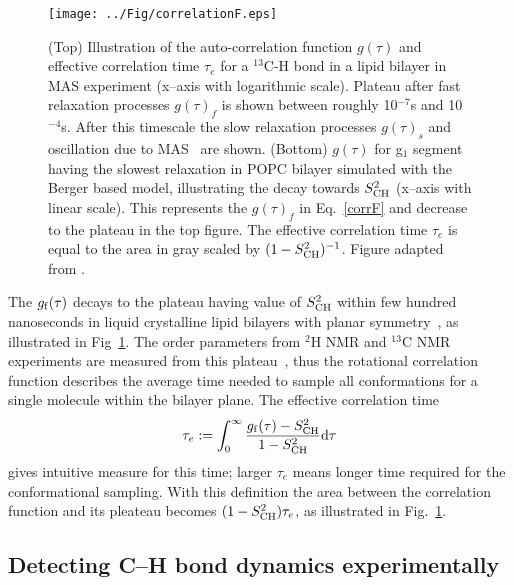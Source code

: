 \documentclass[aps,prl,superscriptaddress,twocolumn]{revtex4}
\begin{document}
\begin{figure}[]
  \texttt{[image: ../Fig/correlationF.eps]}
\newline
  \caption{\label{correlationF}
    (Top) Illustration of the auto-correlation function $g(\tau)$ and effective
    correlation time $\tau_e$ for a $^{13}$C-H bond in a lipid bilayer in MAS experiment (x--axis with logarithmic scale).
    Plateau after fast relaxation processes $g(\tau)_f$ is shown between roughly 10$^{-7}$s and 10$^{-4}$s.
    After this timescale the slow relaxation processes $g(\tau)_s$ and oscillation due to MAS~\cite{nowacka10} are shown.
    (Bottom) $g(\tau)$ for g$_1$ segment having the slowest relaxation in POPC bilayer simulated with the Berger based model,
    illustrating the decay towards $S^2_{{\rm CH}}$ (x--axis with linear scale). 
    This represents the $g(\tau)_f$ in Eq.~\ref{corrF} and decrease to the plateau in the top figure.
    The effective correlation time $\tau_e$ is equal to the area in gray scaled by $(1-S^2_{{\rm CH}})^{-1}$.
    Figure adapted from \cite{ferreira15}.
  } 
\end{figure}


The $g_{\rm{f}}(\tau)$ decays to the plateau having value of $S_{{\rm CH}}^2$ within few hundred nanoseconds 
in liquid crystalline lipid bilayers with planar symmetry~\cite{ferreira15}, as illustrated in Fig~\ref{correlationF}. 
The order parameters from $^2$H NMR and $^{13}$C NMR experiments are measured from this plateau~\cite{ferreira15},
thus the rotational correlation function describes the average time needed to sample all conformations for 
a single molecule within the bilayer plane. The effective correlation time~\cite{Lipari82}
\begin{equation}\label{effCTdef}
\tau_{e}:=\int_0^{\infty} \frac{g_{\rm{f}}(\tau)-S_{\rm{CH}}^2}{1-S_{\rm{CH}}^2} \mathrm{d}\tau
\end{equation} 
gives intuitive measure for this time; larger $\tau_e$ means longer time required for the conformational sampling.
With this definition the area between the correlation function and its pleateau becomes $(1-S_{\rm{CH}}^2)\tau_{e}$, 
as illustrated in Fig.~\ref{correlationF}.

\subsection{Detecting C--H bond dynamics experimentally}\label{dynamicsEXP}
\end{document}
